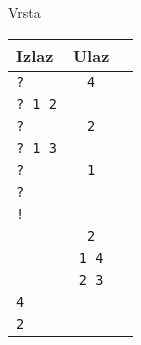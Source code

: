 \begin{statement}[
  problempoints=100,
  timelimit=1 sekunda,
  memorylimit=512 MiB,
]{Vrsta}
{\renewcommand{\arraystretch}{1.4}
  \setlength{\tabcolsep}{6pt}
  \begin{tabular}{lcl}
    Izlaz & Ulaz\\ \midrule
    \texttt{\frenchspacing?} & \texttt{4} \\
    \texttt{\frenchspacing? 1 2} & \texttt{}  \\
    \texttt{\frenchspacing? } & \texttt{2} \\
    \texttt{\frenchspacing? 1 3} & \texttt{} \\
    \texttt{\frenchspacing? } & \texttt{1} \\
    \texttt{\frenchspacing?} & \texttt{}\\
    \texttt{\frenchspacing!} &\\
    \texttt{} & \texttt{2} \\
    \texttt{} & \texttt{1 4} \\
    \texttt{} & \texttt{2 3} \\
    \texttt{4} & \texttt{} \\
    \texttt{2} & \texttt{} \\
\end{tabular}}


\end{statement}

